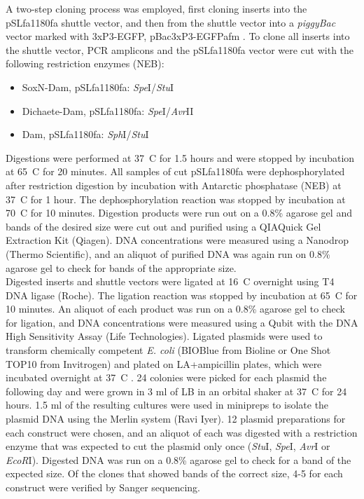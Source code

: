 A two-step cloning process was employed, first cloning inserts into the pSLfa1180fa shuttle vector, and then from the shuttle vector into a \emph{piggyBac} vector marked with 3xP3-EGFP, pBac{3xP3-EGFPafm} \citep{horn_versatile_2000}. To clone all inserts into the shuttle vector, PCR amplicons and the pSLfa1180fa vector were cut with the following restriction enzymes (NEB):
\begin{itemize}
	\item SoxN-Dam, pSLfa1180fa: \emph{Spe}I/\emph{Stu}I
	\item Dichaete-Dam, pSLfa1180fa: \emph{Spe}I/\emph{Avr}II
	\item Dam, pSLfa1180fa: \emph{Sph}I/\emph{Stu}I
\end{itemize}
Digestions were performed at 37\degree~C for 1.5 hours and were stopped by incubation at 65\degree~C for 20 minutes. All samples of cut pSLfa1180fa were dephosphorylated after restriction digestion by incubation with Antarctic phosphatase (NEB) at 37\degree~C for 1 hour. The dephosphorylation reaction was stopped by incubation at 70\degree~C for 10 minutes. Digestion products were run out on a 0.8\% agarose gel and bands of the desired size were cut out and purified using a QIAQuick Gel Extraction Kit (Qiagen). DNA concentrations were measured using a Nanodrop (Thermo Scientific), and an aliquot of purified DNA was again run on 0.8\% agarose gel to check for bands of the appropriate size.\\
  
Digested inserts and shuttle vectors were ligated at 16\degree~C overnight using T4 DNA ligase (Roche). The ligation reaction was stopped by incubation at 65\degree~C for 10 minutes. An aliquot of each product was run on a 0.8\% agarose gel to check for ligation, and DNA concentrations were measured using a Qubit with the DNA High Sensitivity Assay (Life Technologies). Ligated plasmids were used to transform chemically competent \emph{E. coli} (BIOBlue from Bioline or One Shot TOP10 from Invitrogen) and plated on LA+ampicillin plates, which were incubated overnight at 37\degree~C . 24 colonies were picked for each plasmid the following day and were grown in 3 ml of LB in an orbital shaker at 37\degree~C for 24 hours. 1.5 ml of the resulting cultures were used in minipreps to isolate the plasmid DNA using the Merlin system (Ravi Iyer). 12 plasmid preparations for each construct were chosen, and an aliquot of each was digested with a restriction enzyme that was expected to cut the plasmid only once (\emph{Stu}I, \emph{Spe}I, \emph{Avr}I or \emph{EcoR}I). Digested DNA was run on a 0.8\% agarose gel to check for a band of the expected size. Of the clones that showed bands of the correct size, 4-5 for each construct were verified by Sanger sequencing.\\

